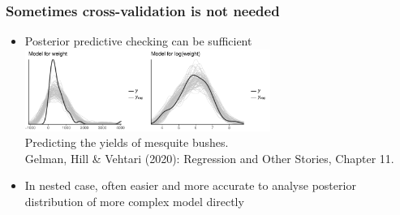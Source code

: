 \documentclass[10pt]{beamer}
\begin{document}
\begin{frame}

\frametitle{Sometimes cross-validation is not needed}

\vspace{-0.5\baselineskip}

  \begin{itemize}
  \item Posterior predictive checking can be sufficient\\
    \vspace{0.5\baselineskip}
    \includegraphics[width=8cm]{figs/mesquite_ppc.pdf}\\
  \vspace{-0.1\baselineskip} {Predicting the yields of mesquite bushes.\\
    \color{gray} \footnotesize
    Gelman, Hill \& Vehtari (2020): Regression and Other Stories, Chapter 11.}\\
  \vspace{-0.8\baselineskip}
  \pause
  \item In nested case, often easier and more accurate to analyse posterior distribution of more complex model directly
  \end{itemize}
\end{frame}
\end{document}
